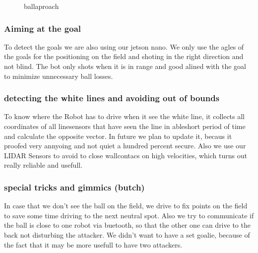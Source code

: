 \documentclass{scrartcl}
\begin{document}
\begin{figure}[!h]
    \begin{center}
    \caption{ballaproach}
    \label{balla}
    \end{center}
    \end{figure}
    
\subsubsection{Aiming at the goal}
To detect the goals we are also using our jetson nano. We only use the agles of the goals for the positioning on the field
and shoting in the right direction and not blind. The bot only shots when it is in range and good alined with the goal to minimize unnecessary ball losses.

\subsubsection{detecting the white lines and avoiding out of bounds}
To know where the Robot has to drive when it see the white line, it collects all coordinates of all linesensors that have seen the line in ableshort period of time
and calculate the opposite vector. In future we plan to update it, becaus it proofed very annyoing and not quiet a hundred percent secure.
Also we use our LIDAR Sensors to avoid to close wallcontacs on high velocities, which turns out really reliable and usefull.

\subsubsection{special tricks and gimmics (butch)}
In case that we don't see the ball on the field, we drive to fix points on the field to save some time driving to the next neutral spot.
Also we try to communicate if the ball is close to one robot via buetooth, so that the other one can drive to the back not disturbing the attacker.
We didn't want to have a set goalie, because of the fact that it may be more usefull to have two attackers.
\end{document}
